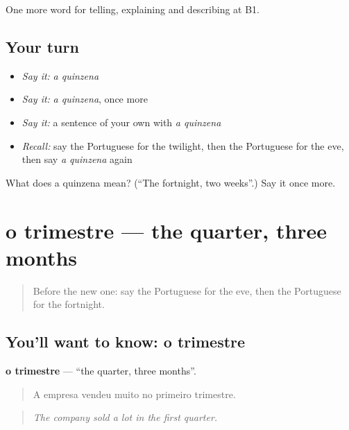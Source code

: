 \begin{grammarlens}[title={What you've built}]
One more word for telling, explaining and describing at B1.
\end{grammarlens}

\subsection*{Your turn}
\begin{itemize}
\raggedright
  \item \emph{Say it:} \emph{a quinzena}
  \item \emph{Say it:} \emph{a quinzena}, once more
  \item \emph{Say it:} a sentence of your own with \emph{a quinzena}
  \item \emph{Recall:} say the Portuguese for the twilight, then the Portuguese for the eve, then say \emph{a quinzena} again
\end{itemize}

\begin{tcolorbox}[breakable,colback=teal!4,colframe=teal!35!black,title={Before you move on}]
What does a quinzena mean? (\textquotedblleft{}The fortnight, two weeks\textquotedblright{}.) Say it once more.
\end{tcolorbox}
\section[o trimestre]{o trimestre — the quarter, three months}

\label{lesson:PT-C276-trimestre}



\begin{quote}
Before the new one: say the Portuguese for the eve, then the Portuguese for the fortnight.
\end{quote}

\subsection*{You'll want to know: o trimestre}
\textbf{o trimestre} — \textquotedblleft{}the quarter, three months\textquotedblright{}.

\begin{quote}
A empresa vendeu muito no primeiro trimestre.
\end{quote}

\begin{quote}
\emph{The company sold a lot in the first quarter.}
\end{quote}

